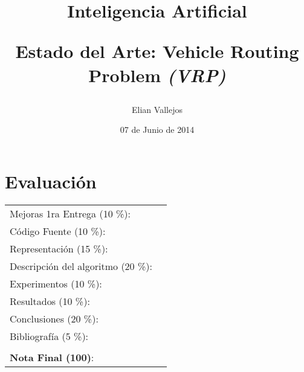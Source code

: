\documentclass[letter, 10pt]{article}
\begin{document}
\title{Inteligencia Artificial \\ \begin{Large}Estado del Arte: Vehicle Routing Problem \emph{(VRP)}\end{Large}}
\author{Elian Vallejos}
\date{07 de Junio de 2014}
\maketitle


\section*{Evaluaci\'on}

\begin{tabular}{ll}
Mejoras 1ra Entrega (10 \%): &  \underline{\hspace{2cm}}\\
C\'odigo Fuente (10 \%): &  \underline{\hspace{2cm}}\\
Representaci\'on (15 \%):  & \underline{\hspace{2cm}} \\
Descripci\'on del algoritmo (20 \%):  & \underline{\hspace{2cm}} \\
Experimentos (10 \%):  & \underline{\hspace{2cm}} \\
Resultados (10 \%):  & \underline{\hspace{2cm}} \\
Conclusiones (20 \%): &  \underline{\hspace{2cm}}\\
Bibliograf\'ia (5 \%): & \underline{\hspace{2cm}}\\
 &  \\
\textbf{Nota Final (100)}:   & \underline{\hspace{2cm}}
\end{tabular}
\vspace{2cm}
\end{document}
